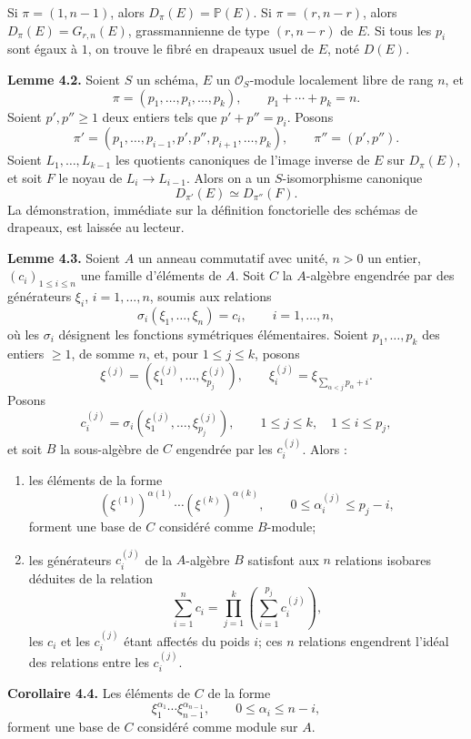 \documentclass[11pt]{article}
\begin{document}
Si \(\pi=(1,n-1)\), alors \(D_\pi(E)=\mathbb P(E)\). Si \(\pi=(r,n-r)\), alors \(D_\pi(E)=G_{r,n}(E)\), grassmannienne de type \((r,n-r)\) de \(E\). Si tous les \(p_i\) sont égaux à \(1\), on trouve le fibré en drapeaux usuel de \(E\), noté \(D(E)\).

\textbf{Lemme 4.2.} Soient \(S\) un schéma, \(E\) un \(\mathcal O_S\)-module localement libre de rang \(n\), et
\[
  \pi=(p_1,\ldots,p_i,\ldots,p_k),\qquad p_1+\cdots+p_k=n.
\]
Soient \(p',p''\geq1\) deux entiers tels que \(p'+p''=p_i\). Posons
\[
  \pi'=(p_1,\ldots,p_{i-1},p',p'',p_{i+1},\ldots,p_k),
  \qquad \pi''=(p',p'').
\]
Soient \(L_1,\ldots,L_{k-1}\) les quotients canoniques de l'image inverse de \(E\) sur \(D_\pi(E)\), et soit \(F\) le noyau de \(L_i\to L_{i-1}\). Alors on a un \(S\)-isomorphisme canonique
\[
  D_{\pi'}(E)\simeq D_{\pi''}(F).
\]
La démonstration, immédiate sur la définition fonctorielle des schémas de drapeaux, est laissée au lecteur.

\textbf{Lemme 4.3.} Soient \(A\) un anneau commutatif avec unité, \(n>0\) un entier, \((c_i)_{1\le i\le n}\) une famille d'éléments de \(A\). Soit \(C\) la \(A\)-algèbre engendrée par des générateurs \(\xi_i\), \(i=1,\ldots,n\), soumis aux relations
\[
  \sigma_i(\xi_1,\ldots,\xi_n)=c_i,
  \qquad i=1,\ldots,n,
\]
où les \(\sigma_i\) désignent les fonctions symétriques élémentaires. Soient \(p_1,\ldots,p_k\) des entiers \(\geq1\), de somme \(n\), et, pour \(1\le j\le k\), posons
\[
  \xi^{(j)}=(\xi_1^{(j)},\ldots,\xi_{p_j}^{(j)}),
  \qquad
  \xi_i^{(j)}=\xi_{\sum_{\alpha<j}p_\alpha+i}.
\]
Posons
\[
  c_i^{(j)}=\sigma_i(\xi_1^{(j)},\ldots,\xi_{p_j}^{(j)}),
  \qquad 1\le j\le k,
  \quad 1\le i\le p_j,
\]
et soit \(B\) la sous-algèbre de \(C\) engendrée par les \(c_i^{(j)}\). Alors :
\begin{enumerate}[label=\textup{\roman*)}]
\item les éléments de la forme
\[
  (\xi^{(1)})^{\alpha(1)}\cdots (\xi^{(k)})^{\alpha(k)},
  \qquad 0\le \alpha_i^{(j)}\le p_j-i,
\]
forment une base de \(C\) considéré comme \(B\)-module;
\item les générateurs \(c_i^{(j)}\) de la \(A\)-algèbre \(B\) satisfont aux \(n\) relations isobares déduites de la relation
\[
  \sum_{i=1}^{n}c_i=\prod_{j=1}^{k}\left(\sum_{i=1}^{p_j}c_i^{(j)}\right),
\]
les \(c_i\) et les \(c_i^{(j)}\) étant affectés du poids \(i\); ces \(n\) relations engendrent l'idéal des relations entre les \(c_i^{(j)}\).
\end{enumerate}

\textbf{Corollaire 4.4.} Les éléments de \(C\) de la forme
\[
  \xi_1^{\alpha_1}\cdots\xi_{n-1}^{\alpha_{n-1}},
  \qquad 0\le\alpha_i\le n-i,
\]
forment une base de \(C\) considéré comme module sur \(A\).
\end{document}
